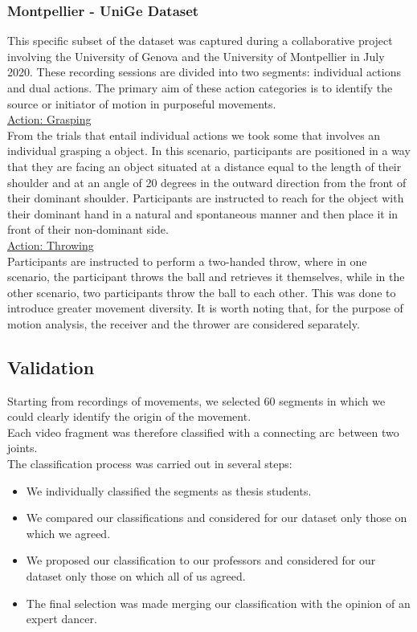 \subsubsection{Montpellier - UniGe Dataset}
This specific subset of the dataset was captured during a collaborative project involving the University of Genova and the University of Montpellier in July 2020. 
These recording sessions are divided into two segments: individual actions and dual actions. 
The primary aim of these action categories is to identify the source or initiator of motion in purposeful movements.\\
\underline{Action: Grasping}\\
From the trials that entail individual actions we took some that involves an individual grasping a object. 
In this scenario, participants are positioned in a way that they are facing an object situated at a distance equal to the length 
of their shoulder and at an angle of 20 degrees in the outward direction from the front of their dominant shoulder. 
Participants are instructed to reach for the object with their dominant hand in a natural and spontaneous manner and then place it in front of their non-dominant side.\\
\underline{Action: Throwing}\\
Participants are instructed to perform a two-handed throw, where in one scenario, 
the participant throws the ball and retrieves it themselves, while in the other scenario, two participants throw the ball to each other. 
This was done to introduce greater movement diversity.
It is worth noting that, for the purpose of motion analysis, the receiver and the thrower are considered separately.

\subsection{Validation}
Starting from recordings of movements, we selected 60 segments in which we could clearly identify the origin of the movement.\\
Each video fragment was therefore classified with a connecting arc between two joints.\\
The classification process was carried out in several steps:
\begin{itemize}
\item{We individually classified the segments as thesis students.} \\
\item{We compared our classifications and considered for our dataset only those on which we agreed.} \\
\item{We proposed our classification to our professors and considered for our dataset only those on which all of us agreed.} \\
\item{The final selection was made merging our classification with the opinion of an expert dancer.} \\
\end{itemize}

